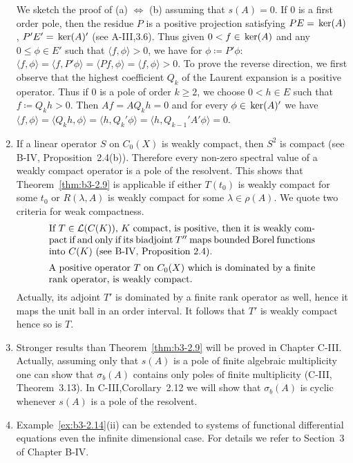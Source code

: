 \begin{remarks}
\begin{enumerate}[\upshape (i), wide, labelindent=.5em]
	We sketch the proof of (a) $\Leftrightarrow$ (b) assuming that $s(A) = 0$.
	If $0$ is a first order pole, then the residue $P$ is a positive projection satisfying $PE = \mathop{}\mathrm{ker}(A)$, $P'E' = \mathop{}\mathrm{ker}(A)'$ (see A-III,3.6).
	Thus given $0 < f \in \mathop{}\mathrm{ker}(A)$ and any $0 \leq \phi \in E'$ such that $\langle f,\phi \rangle > 0$, we have for $\phi \coloneqq P'\phi$: $\langle f,\phi \rangle = \langle f, P'\phi \rangle = \langle Pf,\phi \rangle = \langle f,\phi \rangle > 0$.
	To prove the reverse direction, we first observe that the highest coefficient $Q_{k}$ of the Laurent expansion is a positive operator.
	Thus if $0$ is a pole of order $k \geq 2$, we choose $0 < h \in E$ such that $f \coloneqq Q_{k}h > 0$.
	Then $Af = AQ_{k}h = 0$ and for every $\phi \in \mathop{}\mathrm{ker}(A)'$ we have $\langle f,\phi \rangle = \langle Q_{k}h,\phi \rangle = \langle h,Q_{k}'\phi \rangle = \langle h,Q_{k-1}'A'\phi \rangle = 0$.
	\item 
	If a linear operator $S$ on $C_{0}(X)$ is weakly compact, then $S^{2}$ is compact (see B-IV, Proposition~2.4(b)).
	Therefore every non-zero spectral value of a weakly compact operator is a pole of the resolvent.
	This shows that Theorem~\ref{thm:b3-2.9} is applicable if either $T(t_{0})$ is weakly compact for some $t_{0}$ or $R(\lambda,A)$ is weakly compact for some $\lambda \in \rho(A)$.
	We quote two criteria for weak compactness.
    \begin{equation}\label{eq:b3-2.31}
		\begin{minipage}{.8\textwidth}
    	If   $T \in \L{C(K)}$, $K$ compact, is positive, then it is weakly compact  	if and only if its biadjoint 	$T''$ maps bounded Borel functions into $C(K)$ (see B-IV, Proposition~2.4).
    	\end{minipage}
	\end{equation}
	\begin{equation}\label{eq:b3-2.32}
        \begin{minipage}{.8\textwidth}
    		A positive operator   $T$ on $C_{0}(X)$ which is dominated by a finite rank 
    		operator, is weakly compact. 
    	\end{minipage}
    \end{equation}
    Actually, its adjoint  $T'$ is dominated by a finite rank operator as well, hence it maps the unit ball in an order interval. 
	It follows that $ T' $  is weakly compact hence so is $T$.		
	
		
	\item 
	Stronger results than Theorem~\ref{thm:b3-2.9} will be proved in Chapter C-III.
	Actually, assuming only that $s(A)$ is a pole of finite algebraic multiplicity one can show that $\sigma_{b}(A)$ contains only poles of finite multiplicity (C-III, Theorem~3.13).
	In C-III,Corollary~2.12 we will show that $\sigma_{b}(A)$ is cyclic whenever $s(A)$ is a pole of the resolvent.
	
	\item 
	Example~\ref{ex:b3-2.14}(ii) can be extended to systems of functional differential equations even the infinite dimensional case.
	For details we refer to Section~3 of Chapter B-IV.
\end{enumerate}	
\end{remarks}
